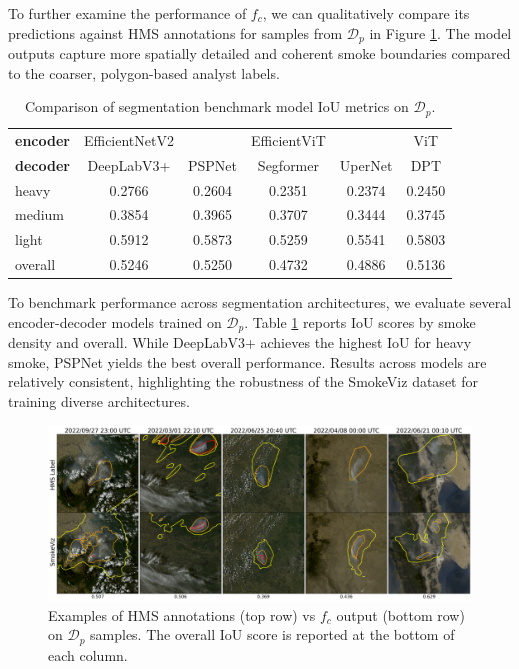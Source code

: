 \documentclass{article}
\begin{document}
To further examine the performance of \(f_c\), we can qualitatively compare its predictions against HMS annotations for samples from \(\mathcal{D}_p\) in Figure \ref{examples}. The model outputs capture more spatially detailed and coherent smoke boundaries compared to the coarser, polygon-based analyst labels.

\begin{table}[!htb] 
    \caption{Comparison of segmentation benchmark model IoU metrics on \(\mathcal{D}_{p}\).}\label{bench}
    \centering
    \begin{tabular}{lccccc}
        \toprule
        \textbf{encoder} & EfficientNetV2 \cite{efficientnetv2} & \cite{efficientnetv2} & EfficientViT \cite{efficientvit} & \cite{efficientvit}& ViT \cite{vit} \\
        \textbf{decoder} & DeepLabV3+ \cite{deeplab} & PSPNet \cite{pspnet} & Segformer \cite{segformer} & UperNet \cite{upernet}& DPT \cite{dpt} \\
        \midrule
        heavy   & 0.2766	&	0.2604	&	0.2351	&	0.2374	&	0.2450 \\
        medium  & 0.3854	&	0.3965	&	0.3707	&	0.3444	&	0.3745 \\
        light   & 0.5912	&	0.5873	&	0.5259	&	0.5541	&	0.5803 \\
        overall & 0.5246	&	0.5250	&	0.4732	&	0.4886	&	0.5136 \\
        \bottomrule
    \end{tabular}
\end{table}

To benchmark performance across segmentation architectures, we evaluate several encoder-decoder models trained on \(\mathcal{D}_p\). Table \ref{bench} reports IoU scores by smoke density and overall. While DeepLabV3+ achieves the highest IoU for heavy smoke, PSPNet yields the best overall performance. Results across models are relatively consistent, highlighting the robustness of the SmokeViz dataset for training diverse architectures.

\begin{figure}[!htb]
    \centering
    \includegraphics[width=\linewidth]{figures/examples_small.png}
    \caption{Examples of HMS annotations (top row) vs \(f_{c}\) output (bottom row) on \(\mathcal{D}_{p}\) samples. The overall IoU score is reported at the bottom of each column.}\label{examples}
\end{figure}
\end{document}
